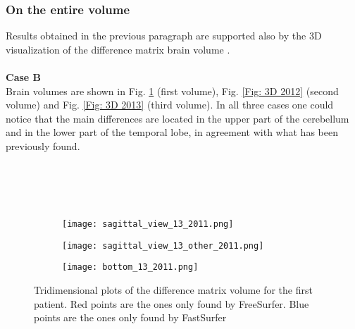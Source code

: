 \documentclass{article}
\begin{document}
	\subsubsection{On the entire volume}
	Results obtained in the previous paragraph are supported also by the 3D visualization of the difference matrix brain volume .
	\\
	\\
	\textbf{Case B}
	\\
	Brain volumes are shown in Fig. \ref{Fig: 3D 2011} (first volume), Fig. \ref{Fig: 3D 2012} (second volume) and Fig. \ref{Fig: 3D 2013} (third volume). 
	In all three cases one could notice that the main differences are located in the upper part of the cerebellum and in the lower part of the temporal lobe, in agreement with what has been previously found.
	\\
	\\
	\\
	\\
	\\
	\begin{figure} [h]
		\centering
		\begin{subfigure} [b] {0.4\linewidth} \texttt{[image: sagittal\_view\_13\_2011.png]}
		\end{subfigure}
		\hfill
		\begin{subfigure} [b] {0.4\linewidth} \texttt{[image: sagittal\_view\_13\_other\_2011.png]}
		\end{subfigure}
		\hfill
		\begin{subfigure} [b] {0.45\linewidth} \texttt{[image: bottom\_13\_2011.png]}
		\end{subfigure}
		\caption{Tridimensional plots of the difference matrix volume for the first patient. Red points are the ones only found by FreeSurfer. Blue points are the ones only found by FastSurfer}
		\label{Fig: 3D 2011}
	\end{figure}
	\\
	\\
	\\
	\\
	\\
	\\
	\\
	\\
	\\
	\\
	\\
	\\
	\\
\end{document}
